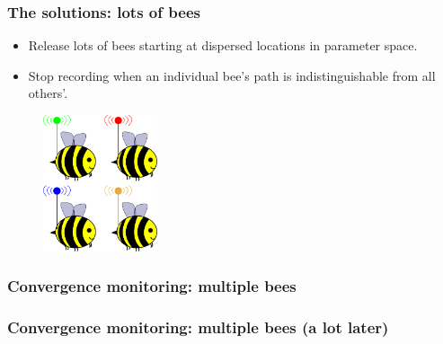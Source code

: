 \documentclass[handout]{beamer}
\begin{document}
\begin{frame}
\frametitle{The solutions: lots of bees}

\begin{itemize}
\item<2-> Release lots of bees starting at dispersed locations in parameter space.
\item<3-> Stop recording when an individual bee's path is indistinguishable from all others'.
\end{itemize}

\begin{figure}[ht]
\centerline{\includegraphics[width=0.3\textwidth]{./Figures/lec4_bees.pdf}}
\end{figure}

\end{frame}

\begin{frame}
\frametitle{Convergence monitoring: multiple bees}

\begin{figure}[t]
\centerline{}
\end{figure}

\end{frame}

\begin{frame}
\frametitle{Convergence monitoring: multiple bees (a lot later)}

\begin{figure}[t]
\centerline{}
\end{figure}

\end{frame}
\end{document}

